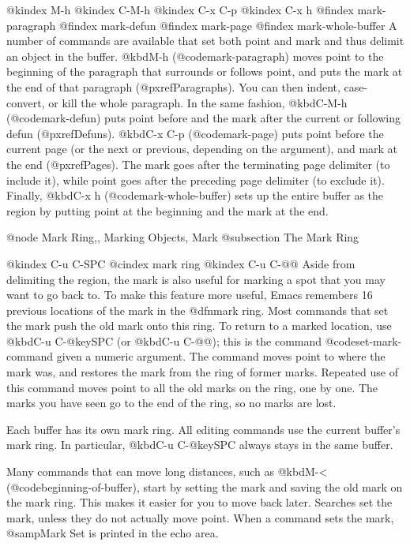 {{{@kindex M-h
@kindex C-M-h
@kindex C-x C-p
@kindex C-x h
@findex mark-paragraph
@findex mark-defun
@findex mark-page
@findex mark-whole-buffer
   A number of commands are available that set both point and mark and
thus delimit an object in the buffer.  @kbd{M-h} (@code{mark-paragraph})
moves point to the beginning of the paragraph that surrounds or follows
point, and puts the mark at the end of that paragraph
(@pxref{Paragraphs}).  You can then indent, case-convert, or kill the
whole paragraph.  In the same fashion, @kbd{C-M-h} (@code{mark-defun})
puts point before and the mark after the current or following defun
(@pxref{Defuns}).  @kbd{C-x C-p} (@code{mark-page}) puts point before
the current page (or the next or previous, depending on the argument),
and mark at the end (@pxref{Pages}).  The mark goes after the
terminating page delimiter (to include it), while point goes after the
preceding page delimiter (to exclude it).  Finally, @kbd{C-x h}
(@code{mark-whole-buffer}) sets up the entire buffer as the region by
putting point at the beginning and the mark at the end.

@node Mark Ring,, Marking Objects, Mark
@subsection The Mark Ring

@kindex C-u C-SPC
@cindex mark ring
@kindex C-u C-@@
  Aside from delimiting the region, the mark is also useful for marking
a spot that you may want to go back to.  To make this feature more
useful, Emacs remembers 16 previous locations of the mark in the
@dfn{mark ring}.  Most commands that set the mark push the old mark onto
this ring.  To return to a marked location, use @kbd{C-u C-@key{SPC}}
(or @kbd{C-u C-@@}); this is the command @code{set-mark-command} given a
numeric argument.  The command moves point to where the mark was, and
restores the mark from the ring of former marks. Repeated use of this
command moves point to all the old marks on the ring, one by one.
The marks you have seen go to the end of the ring, so no marks are lost.

  Each buffer has its own mark ring.  All editing commands use the current
buffer's mark ring.  In particular, @kbd{C-u C-@key{SPC}} always stays in
the same buffer.

  Many commands that can move long distances, such as @kbd{M-<}
(@code{beginning-of-buffer}), start by setting the mark and saving the
old mark on the mark ring.  This makes it easier for you to move back
later.  Searches set the mark, unless they do not actually move point.
When a command sets the mark, @samp{Mark Set} is printed in the
echo area.

}}}
